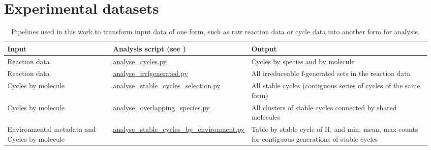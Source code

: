 \chapter{Experimental datasets}\label{datasets}



\begin{table}
	\scriptsize
	\begin{center}
		\caption{Pipelines used in this work to transform input data of one form, such as raw reaction data or cycle data into another form for analysis.}\label{tbl:datasets}
		\begin{tabular}{p{4cm}p{4cm}p{5cm}}
			\toprule
			Input & Analysis script (see \cite{toyworld2}) & Output\\
			\midrule
			Reaction data 									& \url{analyse_cycles.py}						& Cycles by species and by molecule \\
			Reaction data									& \url{analyse_irrfgenerated.py}				& All irreduceable f-generated sets in the reaction data\\
			\midrule
			Cycles by molecule								& \url{analyse_stable_cycles_selection.py}		& All stable cycles (contiguous series of cycles of the same form)\\
			Cycles by molecule								& \url{analyse_overlapping_species.py}			& All clusters of stable cycles connected by shared molecules\\
			Environmental metadata and Cycles by molecule	& \url{analyse_stable_cycles_by_environment.py}	& Table by stable cycle of H, and min, mean, max counts for contiguous generations of stable cycles\\
			\bottomrule
		\end{tabular}
	\end{center}
\end{table}


